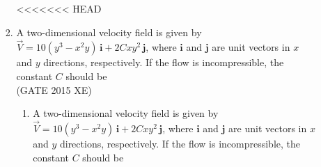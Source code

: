 \documentclass[journal,12pt,onecolumn]{IEEEtran}
\begin{document}
\begin{enumerate}
\begin{enumerate}
\begin{enumerate}[label=\arabic*)]
\begin{multicols}{2}
<<<<<<< HEAD
\end{multicols}


\item A two-dimensional velocity field is given by  
$\vec{V} = 10(y^3 - x^2 y) \, \mathbf{i} + 2C x y^2 \, \mathbf{j}$, where $\mathbf{i}$ and $\mathbf{j}$ are unit vectors in $x$ and $y$ directions, respectively. If the flow is incompressible, the constant $C$ should be \\

\hfill{(GATE 2015 XE)} 
\begin{multicols}{4}
\begin{enumerate}
=======

\newpage

\item A two-dimensional velocity field is given by  
$\vec{V} = 10(y^3 - x^2 y) \, \mathbf{i} + 2C x y^2 \, \mathbf{j}$, where $\mathbf{i}$ and $\mathbf{j}$ are unit vectors in $x$ and $y$ directions, respectively. If the flow is incompressible, the constant $C$ should be  


\end{enumerate}
\end{multicols}
\end{enumerate}
\end{enumerate}
\end{enumerate}
\end{document}
